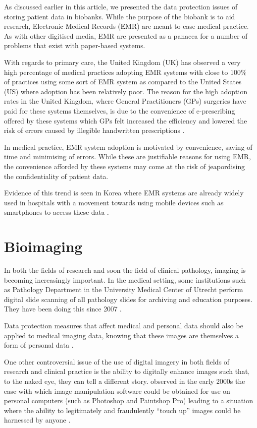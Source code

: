 \documentclass[british,a4paper, 12pt]{article}
\begin{document}
As discussed earlier in this article, we presented the data protection issues of storing
patient data in biobanks. While the purpose of the biobank is to aid research, Electronic
Medical Records (EMR) are meant to ease medical practice. As with other digitised media,
EMR are presented as a panacea for a number of problems that exist with paper-based
systems.

With regards to primary care, the United Kingdom (UK) has observed a very high percentage
of medical practices adopting EMR systems with close to 100\% of practices using some sort
of EMR system as compared to the United States (US) where adoption has been relatively poor.
The reason for the high adoption rates in the United Kingdom, where General Practitioners (GPs)
surgeries have paid for these systems themselves, is due to the convenience of e-prescribing
offered by these systems which GPs felt increased the efficiency and lowered the risk of
errors caused by illegible handwritten prescriptions \cite{schade2006prescribing}.

In medical practice, EMR system adoption is motivated by convenience, saving of time and 
minimising of errors. While these are justifiable reasons for using EMR, the convenience 
afforded by these systems may come at the risk of jeapordising the confidentiality of 
patient data.

Evidence of this trend is seen in Korea where EMR systems are already widely 
used in hospitals with a movement towards using mobile devices such as smartphones to 
access these data \cite{yeo2012pitfalls}.

\section{Bioimaging}
In both the fields of research and soon the field of clinical pathology, imaging is becoming 
increasingly important. In the medical setting, some institutions such as Pathology Department 
in the University Medical Center of Utrecht perform digital slide scanning of all pathology 
slides for archiving and education purposes. They have been doing this since 2007
\parencite{stathonikos2013going}.

Data protection measures that affect medical and personal data should also be 
applied to medical imaging data, knowing that these images are themselves a form 
of personal data \parencite{duquenoy2008considering}.

One other controversial issue of the use of digital imagery in both fields of research and 
clinical practice is the ability to digitally enhance images such that, to the naked eye, they 
can tell a different story. \citeauthor*{cutrone2001true} observed in the early 2000s the ease 
with which image manipulation software could be obtained for use on personal computers  (such as 
Photoshop and Paintshop Pro) leading to a situation where the ability to legitimately and 
fraudulently ``touch up'' images could be harnessed by anyone \parencite{cutrone2001true}.
\end{document}
